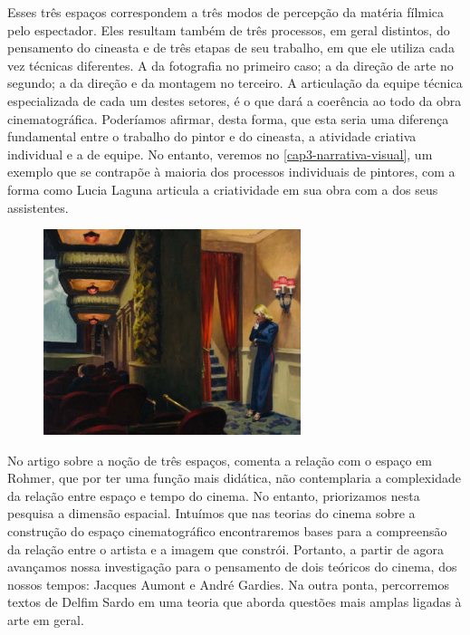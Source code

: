 Esses três espaços correspondem a três modos de percepção da matéria
fílmica pelo espectador. Eles resultam também de três processos, em
geral distintos, do pensamento do cineasta e de três etapas de seu
trabalho, em que ele utiliza cada vez técnicas diferentes. A da
fotografia no primeiro caso; a da direção de arte no segundo; a da
direção e da montagem no terceiro. A articulação da equipe técnica
especializada de cada um destes setores, é o que dará a coerência ao
todo da obra cinematográfica. Poderíamos afirmar, desta forma, que esta
seria uma diferença fundamental entre o trabalho do pintor e do
cineasta, a atividade criativa individual e a de equipe. No entanto,
veremos no \cref{cap3-narrativa-visual}, um exemplo que se contrapõe à
maioria dos processos individuais de pintores, com a forma como Lucia
Laguna articula a criatividade em sua obra com a dos seus assistentes.

\begin{figure}
  \flushleft
  \begin{minipage}{2.96404in}
	\caption{}

	\includegraphics[width=2.96404in,height=2.36319in]{figuras/hopper-new-york-moview-1939.pdf.compressed.pdf}
  \end{minipage}
\end{figure}

No artigo sobre a noção de três espaços, \textcite{borges2019sobre}
comenta a relação com o espaço em Rohmer, que por ter uma função mais
didática, não contemplaria a complexidade da relação entre espaço e
tempo do cinema. No entanto, priorizamos nesta pesquisa a dimensão
espacial. Intuímos que nas teorias do cinema sobre a construção do
espaço cinematográfico encontraremos bases para a compreensão da
relação entre o artista e a imagem que constrói. Portanto, a partir de
agora avançamos nossa investigação para o pensamento de dois teóricos
do cinema, dos nossos tempos: Jacques Aumont e André Gardies. Na outra
ponta, percorremos textos de Delfim Sardo em uma teoria que aborda
questões mais amplas ligadas à arte em geral.

